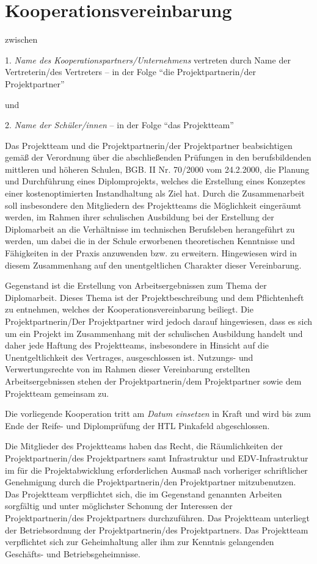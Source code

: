 \chapter{Kooperationsvereinbarung}

zwischen 

1. \emph{Name des Kooperationspartners/Unternehmens} vertreten durch Name der Vertreterin/des Vertreters – in der Folge "`die Projektpartnerin/der Projektpartner"' 

und 

2. \emph{Name der Schüler/innen} – in der Folge "`das Projektteam"'


Das Projektteam und die Projektpartnerin/der Projektpartner beabsichtigen gemäß der Verordnung über die abschließenden Prüfungen in den berufsbildenden mittleren und höheren Schulen, BGB. II Nr. 70/2000 vom 24.2.2000, die Planung und Durchführung eines Diplomprojekts, welches die Erstellung eines Konzeptes einer kostenoptimierten Instandhaltung als Ziel hat. Durch die Zusammenarbeit soll insbesondere den Mitgliedern des Projektteams die Möglichkeit eingeräumt werden, im Rahmen ihrer schulischen Ausbildung bei der Erstellung der Diplomarbeit an die Verhältnisse im technischen Berufsleben herangeführt zu werden, um dabei die in der Schule erworbenen theoretischen Kenntnisse und Fähigkeiten in der Praxis anzuwenden bzw. zu erweitern. Hingewiesen wird in diesem Zusammenhang auf den unentgeltlichen Charakter dieser Vereinbarung. 

Gegenstand ist die Erstellung von Arbeitsergebnissen zum Thema der Diplomarbeit. Dieses Thema ist der Projektbeschreibung und dem Pflichtenheft zu entnehmen, welches der Kooperationsvereinbarung beiliegt. Die Projektpartnerin/Der Projektpartner wird jedoch darauf hingewiesen, dass es sich um ein Projekt im Zusammenhang mit der schulischen Ausbildung handelt und daher jede Haftung des Projektteams, insbesondere in Hinsicht auf die Unentgeltlichkeit des Vertrages, ausgeschlossen ist. Nutzungs- und Verwertungsrechte von im Rahmen dieser Vereinbarung erstellten Arbeitsergebnissen stehen der Projektpartnerin/dem Projektpartner sowie dem Projektteam gemeinsam zu. 

Die vorliegende Kooperation tritt am \emph{\color{red}Datum einsetzen} in Kraft und wird bis zum Ende der Reife- und Diplomprüfung der HTL Pinkafeld abgeschlossen. 

Die Mitglieder des Projektteams haben das Recht, die Räumlichkeiten der Projektpartnerin/des Projektpartners samt Infrastruktur und EDV-Infrastruktur im für die Projektabwicklung erforderlichen Ausmaß nach vorheriger schriftlicher Genehmigung durch die Projektpartnerin/den Projektpartner mitzubenutzen. Das Projektteam verpflichtet sich, die im Gegenstand genannten Arbeiten sorgfältig und unter möglichster Schonung der Interessen der Projektpartnerin/des Projektpartners durchzuführen. Das Projektteam unterliegt der Betriebsordnung der Projektpartnerin/des Projektpartners. Das Projektteam verpflichtet sich zur Geheimhaltung aller ihm zur Kenntnis gelangenden Geschäfts- und Betriebsgeheimnisse. 

